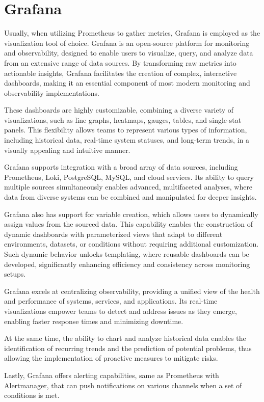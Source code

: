 \section{Grafana}
Usually, when utilizing Prometheus to gather metrics, Grafana is employed as the visualization tool of choice. Grafana is an open-source platform for monitoring and observability, designed to enable users to visualize, query, and analyze data from an extensive range of data sources. By transforming raw metrics into actionable insights, Grafana facilitates the creation of complex, interactive dashboards, making it an essential component of most modern monitoring and observability implementations.

These dashboards are highly customizable, combining a diverse variety of visualizations, such as line graphs, heatmaps, gauges, tables, and single-stat panels. This flexibility allows teams to represent various types of information, including historical data, real-time system statuses, and long-term trends, in a visually appealing and intuitive manner.

Grafana supports integration with a broad array of data sources, including Prometheus, Loki, PostgreSQL, MySQL, and cloud services. Its ability to query multiple sources simultaneously enables advanced, multifaceted analyses, where data from diverse systems can be combined and manipulated for deeper insights.

Grafana also has support for variable creation, which allows users to dynamically assign values from the sourced data. This capability enables the construction of dynamic dashboards with parameterized views that adapt to different environments, datasets, or conditions without requiring additional customization. Such dynamic behavior unlocks templating, where reusable dashboards can be developed, significantly enhancing efficiency and consistency across monitoring setups.

Grafana excels at centralizing observability, providing a unified view of the health and performance of systems, services, and applications. Its real-time visualizations empower teams to detect and address issues as they emerge, enabling faster response times and minimizing downtime.

At the same time, the ability to chart and analyze historical data enables the identification of recurring trends and the prediction of potential problems, thus allowing the implementation of proactive measures to mitigate risks.

Lastly, Grafana offers alerting capabilities, same as Prometheus with Alertmanager, that can push notifications on various channels when a set of conditions is met\cite{grafana, promandgraf}.

